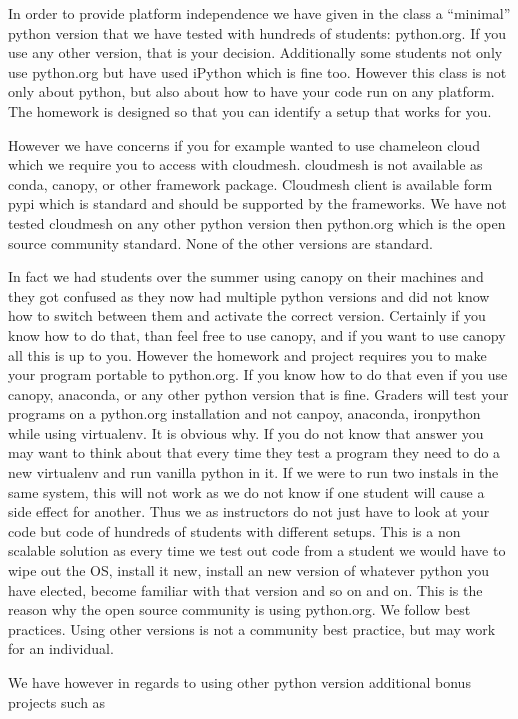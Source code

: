 In order to provide platform independence we have given in the class a
``minimal'' python version that we have tested with hundreds of
students: python.org. If you use any other version, that is your
decision. Additionally some students not only use python.org but have
used iPython which is fine too. However this class is not only about
python, but also about how to have your code run on any platform. The
homework is designed so that you can identify a setup that works for
you.

However we have concerns if you for example wanted to use chameleon
cloud which we require you to access with cloudmesh. cloudmesh is not
available as conda, canopy, or other framework package. Cloudmesh client
is available form pypi which is standard and should be supported by the
frameworks. We have not tested cloudmesh on any other python version
then python.org which is the open source community standard. None of the
other versions are standard.

In fact we had students over the summer using canopy on their machines
and they got confused as they now had multiple python versions and did
not know how to switch between them and activate the correct version.
Certainly if you know how to do that, than feel free to use canopy, and
if you want to use canopy all this is up to you. However the homework
and project requires you to make your program portable to python.org. If
you know how to do that even if you use canopy, anaconda, or any other
python version that is fine. Graders will test your programs on a
python.org installation and not canpoy, anaconda, ironpython while using
virtualenv. It is obvious why. If you do not know that answer you may
want to think about that every time they test a program they need to do
a new virtualenv and run vanilla python in it. If we were to run two
instals in the same system, this will not work as we do not know if one
student will cause a side effect for another. Thus we as instructors do
not just have to look at your code but code of hundreds of students with
different setups. This is a non scalable solution as every time we test
out code from a student we would have to wipe out the OS, install it
new, install an new version of whatever python you have elected, become
familiar with that version and so on and on. This is the reason why the
open source community is using python.org. We follow best practices.
Using other versions is not a community best practice, but may work for
an individual.

We have however in regards to using other python version additional
bonus projects such as

